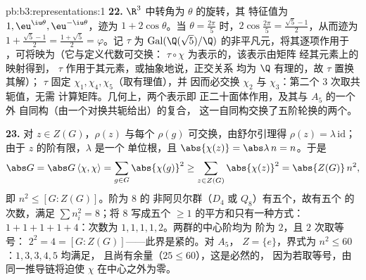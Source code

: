\begin{solution}{pb:b3:representations:1}
\textbf{22.} $\R^3$ 中转角为 $\theta$ 的旋转，其
特征值为 $1, \eu^{\iu\theta}, \eu^{-\iu\theta}$，迹为 $1 +
2\cos\theta$。当 $\theta = \frac{2\pi}5$ 时，$2\cos\frac{2\pi}5
= \frac{\sqrt5 - 1}2$，从而迹为 $1 + \frac{\sqrt5-1}2 =
\frac{1+\sqrt5}2 = \varphi$。记 $\tau$ 为
$\operatorname{Gal}(\Q(\sqrt5)/\Q)$ 的非平凡元，将其逐项作用于
，可将映为（它与定义代数可交换：
$\tau\circ\chi$ 为表示的，该表示由矩阵
经其元素上的映射得到，
$\tau$ 作用于其元素，或抽象地说，正交关系
均为 $\Q$ 有理的，故 $\tau$ 置换其解）；
$\tau$ 固定 $\chi_1, \chi_4, \chi_5$（取有理值），并
因而必交换 $\chi_2$ 与 $\chi_3$：第二个
$3$ 次取共轭值，无需
计算矩阵。几何上，两个表示即
正二十面体作用，及其与 $A_5$ 的一个外
自同构（由一个对换共轭给出）的复合，
这一自同构交换了五阶轮换的两个。

\textbf{23.} 对 $z \in Z(G)$，$\rho(z)$ 与每个
$\rho(g)$ 可交换，由舒尔引理得 $\rho(z) = \lambda\,
\mathrm{id}$；由于 $z$ 的阶有限，$\lambda$ 是一个
单位根，且 $\abs{\chi(z)} = \abs\lambda\,n = n$。于是
\[
\abs G = \abs G\,\langle\chi, \chi\rangle
= \sum_{g \in G}\abs{\chi(g)}^2
\geq \sum_{z \in Z(G)}\abs{\chi(z)}^2
= \abs{Z(G)}\,n^2,
\]
即 $n^2 \leq [G : Z(G)]$。阶为 $8$ 的
非阿贝尔群（$D_4$ 或 $Q_8$）有五个，故有五个
的次数，满足 $\sum n_i^2 = 8$；将 $8$
写成五个 $\geq 1$ 的平方和只有一种方式：$1 + 1 + 1 + 1
+ 4$：次数为 $1, 1, 1, 1, 2$。两群的中心阶均为
阶为 $2$，且 $2$ 次取等号：
$2^2 = 4 = [G : Z(G)]$——此界是紧的。对 $A_5$，
$Z = \{e\}$，界式为 $n^2 \leq 60$：$1, 3, 3, 4, 5$ 均满足，
且尚有余量（$25 \leq 60$），这是必然的，
因为若取等号，由同一推导链将迫使 $\chi$
在中心之外为零。


\end{solution}
